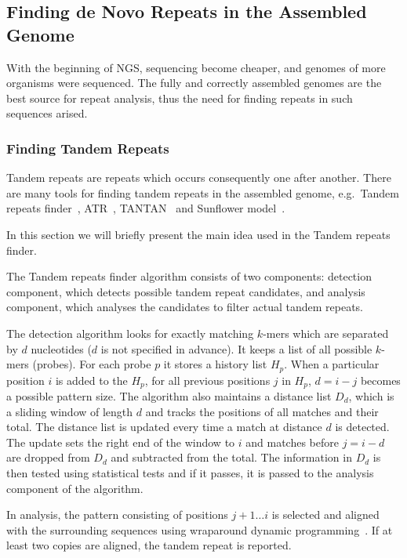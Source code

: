 \subsection{Finding de Novo Repeats in the Assembled Genome}

With the beginning of NGS, sequencing become cheaper, and genomes of more organisms were sequenced. The fully and correctly assembled genomes are the best source for repeat analysis, thus the need for finding repeats in such sequences arised.

\subsubsection{Finding Tandem Repeats}
Tandem repeats are repeats which occurs consequently one after another. There are many tools for finding tandem repeats in the assembled genome, e.g.\ Tandem repeats finder~\cite{trf}, ATR~\cite{atr}, TANTAN~\cite{tantan} and Sunflower model~\cite{nanasi2014probabilistic}.

In this section we will briefly present the main idea used in the Tandem repeats finder.

The Tandem repeats finder algorithm consists of two components: detection component, which detects possible tandem repeat candidates, and analysis component, which analyses the candidates to filter actual tandem repeats.

The detection algorithm looks for exactly matching $k$-mers which are separated by $d$ nucleotides ($d$ is not specified in advance). It keeps a list of all possible $k$-mers (probes).
For each probe $p$ it stores a history list $H_p$.
When a particular position $i$ is added to the $H_p$, for all previous positions $j$ in $H_p$, $d = i - j$ becomes a possible pattern size.
The algorithm also maintains a distance list $D_d$, which is a sliding window of length $d$ and tracks the positions of all matches and their total. The distance list is updated every time a match at distance $d$ is detected. The update sets the right end of the window to $i$ and matches before $j = i - d$ are dropped from $D_d$ and subtracted from the total. The information in $D_d$ is then tested using statistical tests and if it passes, it is passed to the analysis component of the algorithm.

In analysis, the pattern consisting of positions $j+1\dots i$ is selected and aligned with the surrounding sequences using wraparound dynamic programming~\cite{fischetti1992apostolico, myers1989approximate}. If at least two copies are aligned, the tandem repeat is reported.

